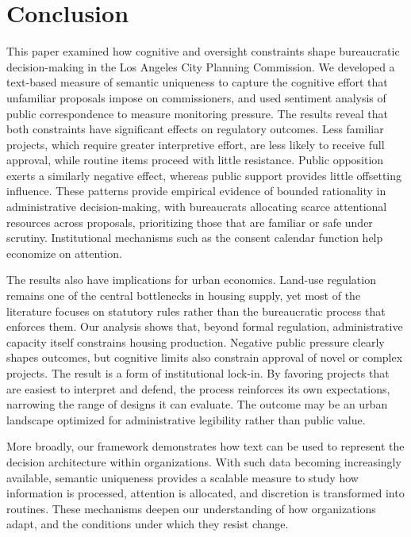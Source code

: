\section{Conclusion}\label{sec_conclusion}

This paper examined how cognitive and oversight constraints shape bureaucratic decision-making in the Los Angeles City Planning Commission. We developed a text-based measure of semantic uniqueness to capture the cognitive effort that unfamiliar proposals impose on commissioners, and used sentiment analysis of public correspondence to measure monitoring pressure. The results reveal that both constraints have significant effects on regulatory outcomes. Less familiar projects, which require greater interpretive effort, are less likely to receive full approval, while routine items proceed with little resistance. Public opposition exerts a similarly negative effect, whereas public support provides little offsetting influence. These patterns provide empirical evidence of bounded rationality in administrative decision-making, with bureaucrats allocating scarce attentional resources across proposals, prioritizing those that are familiar or safe under scrutiny. Institutional mechanisms such as the consent calendar function help economize on attention.

The results also have implications for urban economics. Land-use regulation remains one of the central bottlenecks in housing supply, yet most of the literature focuses on statutory rules rather than the bureaucratic process that enforces them. Our analysis shows that, beyond formal regulation, administrative capacity itself constrains housing production. Negative public pressure clearly shapes outcomes, but cognitive limits also constrain approval of novel or complex projects. The result is a form of institutional lock-in. By favoring projects that are easiest to interpret and defend, the process reinforces its own expectations, narrowing the range of designs it can evaluate. The outcome may be an urban landscape optimized for administrative legibility rather than public value.

More broadly, our framework demonstrates how text can be used to represent the decision architecture within organizations. With such data becoming increasingly available, semantic uniqueness provides a scalable measure to study how information is processed, attention is allocated, and discretion is transformed into routines. These mechanisms deepen our understanding of how organizations adapt, and the conditions under which they resist change.


\pagebreak
